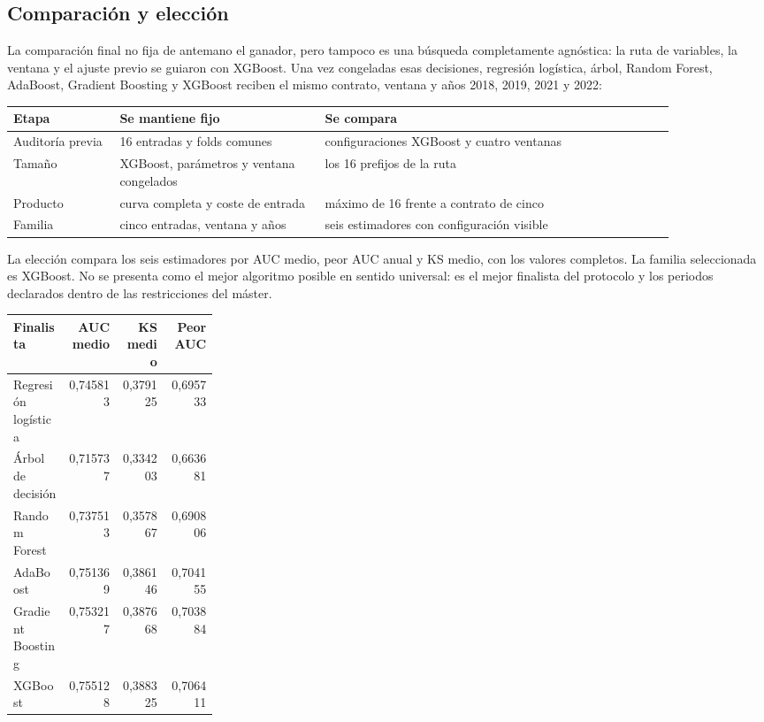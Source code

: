 \documentclass[10pt,a4paper]{article}
\newcommand{\SelectedFamily}{XGBoost}
\newcommand{\XGBAUC}{0,755128}
\newcommand{\XGBKS}{0,388325}
\newcommand{\XGBWorst}{0,706411}
\newcommand{\LogisticAUC}{0,745813}
\newcommand{\LogisticKS}{0,379125}
\newcommand{\LogisticWorst}{0,695733}
\newcommand{\TreeAUC}{0,715737}
\newcommand{\TreeKS}{0,334203}
\newcommand{\TreeWorst}{0,663681}
\newcommand{\RFAUC}{0,737513}
\newcommand{\RFKS}{0,357867}
\newcommand{\RFWorst}{0,690806}
\newcommand{\AdaAUC}{0,751369}
\newcommand{\AdaKS}{0,386146}
\newcommand{\AdaWorst}{0,704155}
\newcommand{\GBAUC}{0,753217}
\newcommand{\GBKS}{0,387668}
\newcommand{\GBWorst}{0,703884}
\begin{document}
\subsection{Comparación y elección}

La comparación final no fija de antemano el ganador, pero tampoco es una búsqueda
completamente agnóstica: la ruta de variables, la ventana y el ajuste previo se
guiaron con XGBoost. Una vez congeladas esas decisiones, regresión logística,
árbol, Random Forest, AdaBoost, Gradient Boosting y XGBoost reciben el mismo
contrato, ventana y años 2018, 2019, 2021 y 2022:

\begin{center}\small
\begin{tabular}{p{0.14\linewidth} p{0.27\linewidth} p{0.46\linewidth}}
\textbf{Etapa} & \textbf{Se mantiene fijo} & \textbf{Se compara}\\ \hline
Auditoría previa & 16 entradas y folds comunes & configuraciones XGBoost y cuatro ventanas\\
Tamaño & XGBoost, parámetros y ventana congelados & los 16 prefijos de la ruta\\
Producto & curva completa y coste de entrada & máximo de 16 frente a contrato de cinco\\
Familia & cinco entradas, ventana y años & seis estimadores con configuración visible\\
\end{tabular}
\end{center}

La elección compara los seis estimadores por AUC medio, peor AUC anual y KS
medio, con los valores completos. La familia seleccionada es
\SelectedFamily{}. No se presenta como el mejor algoritmo posible en sentido
universal: es el mejor finalista del protocolo y los periodos declarados dentro
de las restricciones del máster.

\begin{center}\small
\begin{tabular}{p{0.27\linewidth} r r r}
\textbf{Finalista} & \textbf{AUC medio} & \textbf{KS medio} & \textbf{Peor AUC}\\ \hline
Regresión logística & \LogisticAUC{} & \LogisticKS{} & \LogisticWorst{}\\
Árbol de decisión & \TreeAUC{} & \TreeKS{} & \TreeWorst{}\\
Random Forest & \RFAUC{} & \RFKS{} & \RFWorst{}\\
AdaBoost & \AdaAUC{} & \AdaKS{} & \AdaWorst{}\\
Gradient Boosting & \GBAUC{} & \GBKS{} & \GBWorst{}\\
XGBoost & \XGBAUC{} & \XGBKS{} & \XGBWorst{}\\
\end{tabular}
\end{center}
\end{document}
